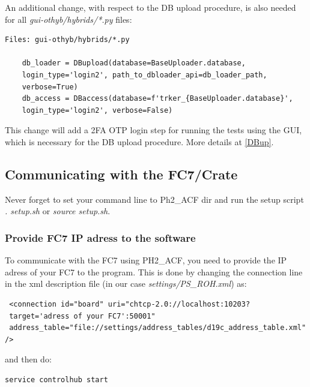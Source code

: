 \documentclass[10pt,a4paper]{article}
\begin{document}
\newpage

An additional change, with respect to the DB upload procedure, is also needed for all \emph{gui-othyb/hybrids/*.py} files: 

\begin{framed}
\begin{verbatim}
Files: gui-othyb/hybrids/*.py

    db_loader = DBupload(database=BaseUploader.database,
    login_type='login2', path_to_dbloader_api=db_loader_path, 
    verbose=True)
    db_access = DBaccess(database=f'trker_{BaseUploader.database}', 
    login_type='login2', verbose=False)

\end{verbatim}
\end{framed}

This change will add a 2FA OTP login step for running the tests using the GUI, which is necessary for the DB upload procedure. More details at \ref{DBup}.

\subsection{Communicating with the FC7/Crate}

Never forget to set your command line to Ph2\_ACF dir and run the setup script \emph{. setup.sh} or \emph{source setup.sh}.

\subsubsection{Provide FC7 IP adress to the software}
To communicate with the FC7 using PH2\_ACF, you need to provide the IP adress of your FC7 to the program. This is done by changing the connection line in the xml description file (in our case \emph{settings/PS\_ROH.xml}) as:

\begin{framed}
\begin{verbatim}
 <connection id="board" uri="chtcp-2.0://localhost:10203?
 target='adress of your FC7':50001" 
 address_table="file://settings/address_tables/d19c_address_table.xml" />
\end{verbatim}
\end{framed}

and then do:
\begin{framed}
\begin{verbatim}
service controlhub start
\end{verbatim}
\end{framed}
\end{document}
